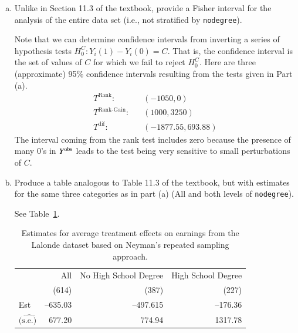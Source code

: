 \begin{enumerate}[(a)]
\item
  \begin{quoting}
    Unlike in Section 11.3 of the textbook, provide a Fisher interval
    for the analysis of the entire data set (i.e., not stratified by
    \texttt{nodegree}).
  \end{quoting}
  Note that we can determine confidence intervals from inverting a
  series of hypothesis tests $H_{0}^C: Y_i(1) - Y_i(0) = C$.  That is,
  the confidence interval is the set of values of $C$ for which we
  fail to reject $H^C_0$.  Here are three (approximate) 95\%
  confidence intervals resulting from the tests given in Part (a).
  \begin{align*}
    T^{\text{Rank}}:\;\;\;& (-1050, 0) \\
    T^{\text{Rank-Gain}}:\;\;\;& (1000, 3250) \\
    T^{\text{dif}}:\;\;\;&  (-1877.55, 693.88)
  \end{align*}
  The interval coming from the rank test includes zero because the
  presence of many 0's in $Y^{\text{obs}}$ leads to the test being very
  sensitive to small perturbations of $C$. 
\item
  \begin{quoting}
    Produce a table analogous to Table 11.3 of the textbook, but with
    estimates for the same three categories as in part (a) (All and
    both levels of \texttt{nodegree}).
  \end{quoting}
  See Table~\ref{tab:neyman}.
  \begin{table}[ht!]
    \centering
    \begin{tabular}{l|rrr}
      \toprule
                                & All      & No High School Degree & High School Degree \\
                                & (614)    & (387)                 & (227)              \\ \midrule
      Est                       & --635.03 & --497.615             & --176.36           \\
      $(\widehat{\text{s.e.})}$ & 677.20   & 774.94                & 1317.78            \\ 
      \bottomrule
    \end{tabular}
    \caption{\label{tab:neyman}Estimates for average treatment effects on earnings from
      the Lalonde dataset based on Neyman's repeated sampling approach.
}
\end{table}
\end{enumerate}
